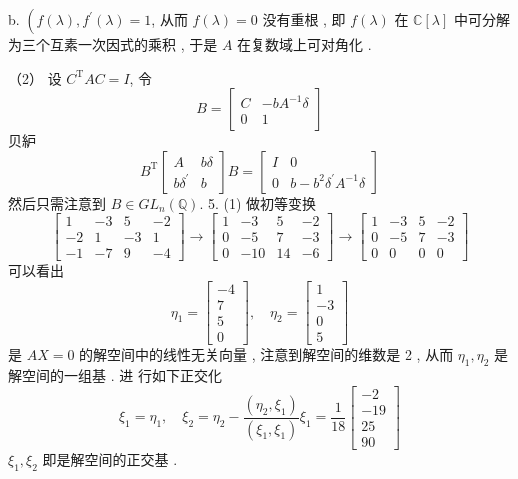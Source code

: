 \documentclass[10pt]{article}
\begin{document}
b. $\left(f(\lambda), f^{\prime}(\lambda)=1\right.$,  从而  $f(\lambda)=0$  没有重根 ,  即  $f(\lambda)$  在  $\mathbb{C}[\lambda]$  中可分解为三个互素一次因式的乘积 ,  于是  $A$  在复数域上可对角化 .

（2） 设  $C^{\mathrm{T}} A C=I$,  令 
$$
B=\left[\begin{array}{cc}
C & -b A^{-1} \delta \\
0 & 1
\end{array}\right]
$$
 贝䋆 
$$
B^{\mathrm{T}}\left[\begin{array}{cc}
A & b \delta \\
b \delta^{\prime} & b
\end{array}\right] B=\left[\begin{array}{cc}
I & 0 \\
0 & b-b^{2} \delta^{\prime} A^{-1} \delta
\end{array}\right]
$$
 然后只需注意到  $B \in G L_{n}(\mathbb{Q})$. 5. (1)  做初等变换 
$$
\left[\begin{array}{cccc}
1 & -3 & 5 & -2 \\
-2 & 1 & -3 & 1 \\
-1 & -7 & 9 & -4
\end{array}\right] \rightarrow\left[\begin{array}{cccc}
1 & -3 & 5 & -2 \\
0 & -5 & 7 & -3 \\
0 & -10 & 14 & -6
\end{array}\right] \rightarrow\left[\begin{array}{cccc}
1 & -3 & 5 & -2 \\
0 & -5 & 7 & -3 \\
0 & 0 & 0 & 0
\end{array}\right]
$$
 可以看出 
$$
\eta_{1}=\left[\begin{array}{c}
-4 \\
7 \\
5 \\
0
\end{array}\right], \quad \eta_{2}=\left[\begin{array}{c}
1 \\
-3 \\
0 \\
5
\end{array}\right]
$$
 是  $A X=0$  的解空间中的线性无关向量 ,  注意到解空间的维数是  2 ,  从而  $\eta_{1}, \eta_{2}$  是解空间的一组基 .  进   行如下正交化 
$$
\xi_{1}=\eta_{1}, \quad \xi_{2}=\eta_{2}-\frac{\left(\eta_{2}, \xi_{1}\right)}{\left(\xi_{1}, \xi_{1}\right)} \xi_{1}=\frac{1}{18}\left[\begin{array}{c}
-2 \\
-19 \\
25 \\
90
\end{array}\right]
$$
$\xi_{1}, \xi_{2}$  即是解空间的正交基 .
\end{document}
